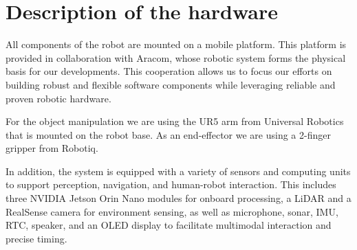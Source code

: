\section{Description of the hardware}
All components of the robot are mounted on a mobile platform. This platform is provided in collaboration with Aracom, whose robotic system forms the physical basis for our developments. This cooperation allows us to focus our efforts on building robust and flexible software components while leveraging reliable and proven robotic hardware.

For the object manipulation we are using the UR5 arm from Universal Robotics that is mounted on the robot base. As an end-effector we are using a 2-finger gripper from Robotiq. %

In addition, the system is equipped with a variety of sensors and computing units to support perception, navigation, and human-robot interaction. This includes three NVIDIA Jetson Orin Nano modules for onboard processing, a LiDAR and a RealSense camera for environment sensing, as well as microphone, sonar, IMU, RTC, speaker, and an OLED display to facilitate multimodal interaction and precise timing.
